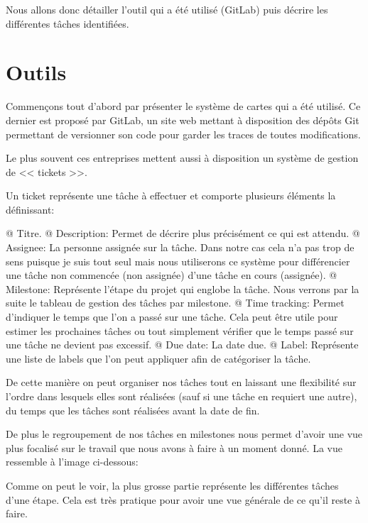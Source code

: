 \documentclass[final]{polytech/polytech}
\begin{document}
	Nous allons donc détailler l'outil qui a été utilisé (GitLab) puis décrire les différentes tâches identifiées.

	\section{Outils\label{sec:issues}}
		Commençons tout d'abord par présenter le système de cartes qui a été utilisé.
		Ce dernier est proposé par GitLab, un site web mettant à disposition des dépôts Git permettant de versionner son code pour garder les traces de toutes modifications.
		
		Le plus souvent ces entreprises mettent aussi à disposition un système de gestion de << tickets >>.
		
		
		Un ticket représente une tâche à effectuer et comporte plusieurs éléments la définissant:
		\begin{easylist}
			@ Titre.
			@ Description: Permet de décrire plus précisément ce qui est attendu.
			@ Assignee: La personne assignée sur la tâche. Dans notre cas cela n'a pas trop de sens puisque je suis tout seul mais nous utiliserons ce système pour différencier une tâche non commencée (non assignée) d'une tâche en cours (assignée).
			@ Milestone: Représente l'étape du projet qui englobe la tâche. Nous verrons par la suite le tableau de gestion des tâches par milestone.
			@ Time tracking: Permet d'indiquer le temps que l'on a passé sur une tâche. Cela peut être utile pour estimer les prochaines tâches ou tout simplement vérifier que le temps passé sur une tâche ne devient pas excessif.
			@ Due date: La date due.
			@ Label: Représente une liste de labels que l'on peut appliquer afin de catégoriser la tâche.
		\end{easylist}
		
		De cette manière on peut organiser nos tâches tout en laissant une flexibilité sur l'ordre dans lesquels elles sont réalisées (sauf si une tâche en requiert une autre), du temps que les tâches sont réalisées avant la date de fin.
		
		De plus le regroupement de nos tâches en milestones nous permet d'avoir une vue plus focalisé sur le travail que nous avons à faire à un moment donné.
		La vue ressemble à l'image ci-dessous:
		
		Comme on peut le voir, la plus grosse partie représente les différentes tâches d'une étape. Cela est très pratique pour avoir une vue générale de ce qu'il reste à faire.
	
\end{document}
